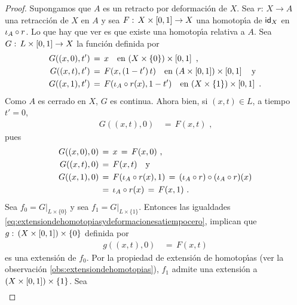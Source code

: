 \begin{proof}
	Supongamos que $A$ es un retracto por deformaci\'{o}n de $X$. Sea
	$r:\,X\rightarrow A$ una retracci\'{o}n de $X$ en $A$ y sea
	$F:\,X\times\intervalo\rightarrow X$ una homotop\'{\i}a de $\id[X]$
	en $\inc[A]\circ r$. Lo que hay que ver es que existe una
	homotop\'{\i}a relativa a $A$. Sea $G:\,L\times\intervalo\rightarrow X$
	la funci\'{o}n definida por
	\begin{equation}
		\label{eq:extensiondehomotopiasydeformaciones}
	\begin{aligned}
		G((x,0),t') & \,=\, x \quad\text{en }
			(X\times\{0\})\times\intervalo \text{ ,} \\
		G((x,t),t') & \,=\, F(x,(1-t')\,t) \quad\text{en }
			(A\times\intervalo)\times\intervalo \quad\text{y} \\
		G((x,1),t') & \,=\,F(\inc[A]\circ r(x),1-t') \quad\text{en }
			(X\times\{1\})\times\intervalo
		\text{ .}
	\end{aligned}
	\end{equation}
	Como $A$ es cerrado en $X$, $G$ es continua. Ahora bien, si
	$(x,t)\in L$, a tiempo $t'=0$,
	\begin{align*}
		G((x,t),0) & \,=\,F(x,t)
		\text{ ,}
	\end{align*}
	pues
	\begin{equation}
		\label{eq:extensiondehomotopiasydeformacionesatiempocero}
	\begin{aligned}
		G((x,0),0) & \,=\,x\,=\,F(x,0) \text{ ,} \\
		G((x,t),0) & \,=\,F(x,t) \quad\text{y} \\
		G((x,1),0) & \,=\,F(\inc[A]\circ r(x),1) \,=\,
			(\inc[A]\circ r)\circ (\inc[A]\circ r) (x) \\
		& \,=\,\inc[A]\circ r(x) \,=\, F(x,1)
		\text{ .}
	\end{aligned}
	\end{equation}
	Sea $f_{0}=G|_{L\times\{0\}}$ y sea $f_{1}=G|_{L\times\{1\}}$.
	Entonces las igualdades
	\eqref{eq:extensiondehomotopiasydeformacionesatiempocero},
	implican que $g:\,(X\times\intervalo)\times\{0\}$ definida por
	\begin{align*}
		g((x,t),0) & \,=\, F(x,t)	
	\end{align*}
	es una extensi\'{o}n de $f_{0}$. Por la propiedad de extensi\'{o}n de
	homotop\'{\i}as (ver la observaci\'{o}n
	\ref{obs:extensiondehomotopias}), $f_{1}$ admite una extensi\'{o}n a
	$(X\times\intervalo)\times\{1\}$. Sea
	\begin{align*}

\end{align*}
\end{proof}
